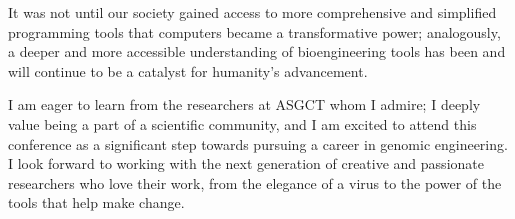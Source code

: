 \documentclass[11pt,letterpaper]{article}
\begin{document}
\begin{flushleft}
\noindent It was not until our society gained access to more comprehensive and simplified programming tools that computers became a transformative power; analogously, a deeper and more accessible understanding of bioengineering tools has been and will continue to be a catalyst for humanity’s advancement. \\
\bigskip

\noindent I am eager to learn from the researchers at ASGCT whom I admire; I deeply value being a part of a scientific community, and I am excited to attend this conference as a significant step towards pursuing a career in genomic engineering. I look forward to working with the next generation of creative and passionate researchers who love their work, from the elegance of a virus to the power of the tools that help make change. \\
\bigskip

\end{flushleft}
\smallskip

\end{document}

